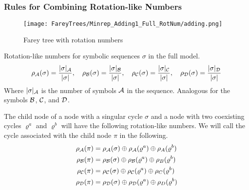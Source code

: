 \subsubsection{Rules for Combining Rotation-like Numbers}


\begin{figure}
    \centering
    \texttt{[image: FareyTrees/Minrep\_Adding1\_Full\_RotNum/adding.png]}
    \caption{Farey tree with rotation numbers}
\end{figure}

\begin{definition}
    Rotation-like numbers for symbolic sequences $\sigma$ in the full model.
    \begin{align*}
        \rho_{\mathcal{A}}(\sigma) = \dfrac{|\sigma|_{\mathcal{A}}}{|\sigma|}, \quad
        \rho_{\mathcal{B}}(\sigma) = \dfrac{|\sigma|_{\mathcal{B}}}{|\sigma|}, \quad
        \rho_{\mathcal{C}}(\sigma) = \dfrac{|\sigma|_{\mathcal{C}}}{|\sigma|}, \quad
        \rho_{\mathcal{D}}(\sigma) = \dfrac{|\sigma|_{\mathcal{D}}}{|\sigma|}
    \end{align*}
    Where $|\sigma|_{\mathcal{A}}$ is the number of symbols $\mathcal{A}$ in the sequence.
    Analogous for the symbols $\mathcal{B}$, $\mathcal{C}$, and $\mathcal{D}$.
\end{definition}

\begin{definition}
\end{definition}

\begin{theorem}
    The child node of a node with a singular cycle $\sigma$ and a node with two coexisting cycles $\varrho^a$ and $\varrho^b$ will have the following rotation-like numbers.
    We will call the cycle associated with the child node $\pi$ in the following.
    \begin{align*}
        \rho_{\mathcal{A}}(\pi) & =
        \rho_{\mathcal{A}}(\sigma) \oplus \rho_{\mathcal{A}}(\varrho^a) \oplus \rho_A(\varrho^b) \\
        \rho_{\mathcal{B}}(\pi) & =
        \rho_{\mathcal{B}}(\sigma) \oplus \rho_{\mathcal{B}}(\varrho^a) \oplus \rho_B(\varrho^b) \\
        \rho_{\mathcal{C}}(\pi) & =
        \rho_{\mathcal{C}}(\sigma) \oplus \rho_{\mathcal{C}}(\varrho^a) \oplus \rho_C(\varrho^b) \\
        \rho_{\mathcal{D}}(\pi) & =
        \rho_{\mathcal{D}}(\sigma) \oplus \rho_{\mathcal{D}}(\varrho^a) \oplus \rho_D(\varrho^b)
    \end{align*}
\end{theorem}

